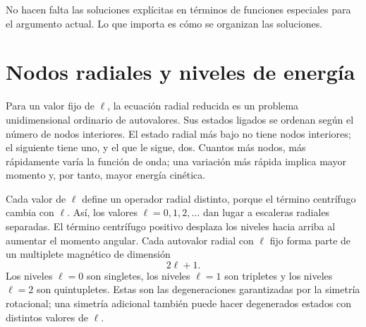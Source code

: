 \begin{classroomqa}
\end{classroomqa}

\begin{classroomqa}
\end{classroomqa}

No hacen falta las soluciones explícitas en términos de funciones especiales para el argumento actual. Lo que importa es cómo se organizan las soluciones.

\section{Nodos radiales y niveles de energía}

Para un valor fijo de \(\ell\), la ecuación radial reducida es un problema unidimensional ordinario de autovalores. Sus estados ligados se ordenan según el número de nodos interiores. El estado radial más bajo no tiene nodos interiores; el siguiente tiene uno, y el que le sigue, dos. Cuantos más nodos, más rápidamente varía la función de onda; una variación más rápida implica mayor momento y, por tanto, mayor energía cinética.

Cada valor de \(\ell\) define un operador radial distinto, porque el término centrífugo cambia con \(\ell\). Así, los valores \(\ell=0,1,2,\ldots\) dan lugar a escaleras radiales separadas. El término centrífugo positivo desplaza los niveles hacia arriba al aumentar el momento angular. Cada autovalor radial con \(\ell\) fijo forma parte de un multiplete magnético de dimensión
\begin{equation}
2\ell+1.
\end{equation}
Los niveles \(\ell=0\) son singletes, los niveles \(\ell=1\) son tripletes y los niveles \(\ell=2\) son quintupletes. Estas son las degeneraciones garantizadas por la simetría rotacional; una simetría adicional también puede hacer degenerados estados con distintos valores de \(\ell\).

